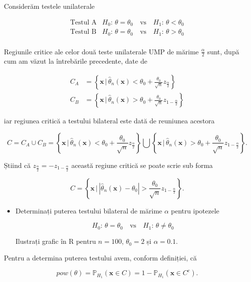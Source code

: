 \documentclass[]{article}
\newenvironment{frshaded*}{%
  \def\FrameCommand{\fboxrule=\FrameRule\fboxsep=\FrameSep \fcolorbox{framecolor}{shadecolor1}}%
  \MakeFramed {\advance\hsize-\width \FrameRestore}}%
{\endMakeFramed}
\newenvironment{rmdblock}[1]
  {\begin{frshaded*}
  \begin{itemize}
  \renewcommand{\labelitemi}{
    \raisebox{-.7\height}[0pt][0pt]{
      {\setkeys{Gin}{width=2em,keepaspectratio}\texttt{[image: images/icons/\#1]}}
    }
  }
  \item
  }
  {
  \end{itemize}
  \end{frshaded*}
  }
\newenvironment{rmdexercise}
  {\begin{rmdblock}{exercise}}
  {\end{rmdblock}}
\begin{document}
Considerăm testele unilaterale

\[
\begin{array}{ll}
  \text{Testul A} & H_0:\, \theta = \theta_0 \quad \text{vs}\quad H_1:\, \theta < \theta_0\\
  \text{Testul B} & H_0:\, \theta = \theta_0 \quad \text{vs}\quad H_1:\, \theta > \theta_0\\
\end{array}
\]

Regiunile critice ale celor două teste unilaterale UMP de mărime
\(\frac{\alpha}{2}\) sunt, după cum am văzut la întrebările precedente,
date de

\begin{align*}
  C_A &= \left\{\mathbf{x}\,|\,\hat{\theta}_n(\mathbf{x}) < \theta_0 + \frac{\theta_0}{\sqrt{n}}z_{\frac{\alpha}{2}}\right\}\\
  C_B &= \left\{\mathbf{x}\,|\,\hat{\theta}_n(\mathbf{x}) > \theta_0 + \frac{\theta_0}{\sqrt{n}}z_{1-\frac{\alpha}{2}}\right\}
\end{align*}

iar regiunea critică a testului bilateral este dată de reuniunea
acestora

\[
  C = C_A\cup C_B = \left\{\mathbf{x}\,|\,\hat{\theta}_n(\mathbf{x}) < \theta_0 + \frac{\theta_0}{\sqrt{n}}z_{\frac{\alpha}{2}}\right\} \bigcup \left\{\mathbf{x}\,|\,\hat{\theta}_n(\mathbf{x}) > \theta_0 + \frac{\theta_0}{\sqrt{n}}z_{1-\frac{\alpha}{2}}\right\}.
\]

Știind că \(z_{\frac{\alpha}{2}} = -z_{1-\frac{\alpha}{2}}\) această
regiune critică se poate scrie sub forma

\[
  C = \left\{\mathbf{x}\,|\,\left|\hat{\theta}_n(\mathbf{x}) - \theta_0\right| > \frac{\theta_0}{\sqrt{n}}z_{1-\frac{\alpha}{2}}\right\}.
\]

\begin{rmdexercise}
Determinați puterea testului bilateral de mărime \(\alpha\) pentru
ipotezele

\[
   H_0:\, \theta = \theta_0 \quad \text{vs}\quad H_1:\, \theta \neq \theta_0
\]

Ilustrați grafic în R pentru \(n = 100\), \(\theta_0 = 2\) și
\(\alpha = 0.1\).
\end{rmdexercise}

Pentru a determina puterea testului avem, conform definiției, că

\[
   pow(\theta) = \mathbb{P}_{H_1}(\mathbf{x}\in C) = 1 - \mathbb{P}_{H_1}(\mathbf{x}\in C^c).
\]
\end{document}
